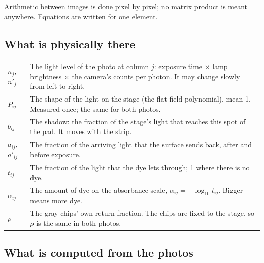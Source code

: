\documentclass[11pt,letter]{article}
\newcommand{\Lten}{\log_{10}}
\begin{document}
\medskip
\noindent Arithmetic between images is done pixel by pixel; no matrix
product is meant anywhere.  Equations are written for one element.

\subsection*{What is physically there}

\begin{tabular}{@{}L{2.4cm}L{12.4cm}@{}}
\toprule
$n_j$, $n'_j$ & The light level of the photo at column $j$: exposure time
  $\times$ lamp brightness $\times$ the camera's counts per photon.  It may
  change slowly from left to right. \\
$P_{ij}$ & The shape of the light on the stage (the flat-field polynomial),
  mean 1.  Measured once; the same for both photos. \\
$b_{ij}$ & The shadow: the fraction of the stage's light that reaches this
  spot of the pad.  It moves with the strip. \\
$a_{ij}$, $a'_{ij}$ & The fraction of the arriving light that the surface
  sends back, after and before exposure. \\
$t_{ij}$ & The fraction of the light that the dye lets through; 1 where
  there is no dye. \\
$\alpha_{ij}$ & The amount of dye on the absorbance scale,
  $\alpha_{ij} = -\Lten t_{ij}$.  Bigger means more dye. \\
$\rho$ & The gray chips' own return fraction.  The chips are fixed to the
  stage, so $\rho$ is the same in both photos. \\
\bottomrule
\end{tabular}

\subsection*{What is computed from the photos}
\end{document}

